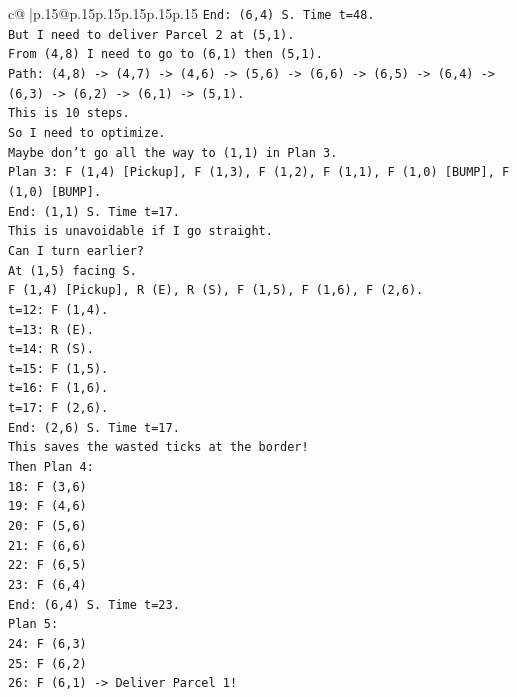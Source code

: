 \documentclass{article}
\begin{document}
{\begin{supertabular}{c@{$\;$}|p{.15\linewidth}@{}p{.15\linewidth}p{.15\linewidth}p{.15\linewidth}p{.15\linewidth}p{.15\linewidth}}
{{{\texttt{End: (6,4) S. Time t=48.} \\
\texttt{But I need to deliver Parcel 2 at (5,1).} \\
\texttt{From (4,8) I need to go to (6,1) then (5,1).} \\
\texttt{Path: (4,8) {-}> (4,7) {-}> (4,6) {-}> (5,6) {-}> (6,6) {-}> (6,5) {-}> (6,4) {-}> (6,3) {-}> (6,2) {-}> (6,1) {-}> (5,1).} \\
\texttt{This is 10 steps.} \\
\texttt{So I need to optimize.} \\
\texttt{Maybe don't go all the way to (1,1) in Plan 3.} \\
\texttt{Plan 3: F (1,4) {[}Pickup{]}, F (1,3), F (1,2), F (1,1), F (1,0) {[}BUMP{]}, F (1,0) {[}BUMP{]}.} \\
\texttt{End: (1,1) S. Time t=17.} \\
\texttt{This is unavoidable if I go straight.} \\
\texttt{Can I turn earlier?} \\
\texttt{At (1,5) facing S.} \\
\texttt{F (1,4) {[}Pickup{]}, R (E), R (S), F (1,5), F (1,6), F (2,6).} \\
\texttt{t=12: F (1,4).} \\
\texttt{t=13: R (E).} \\
\texttt{t=14: R (S).} \\
\texttt{t=15: F (1,5).} \\
\texttt{t=16: F (1,6).} \\
\texttt{t=17: F (2,6).} \\
\texttt{End: (2,6) S. Time t=17.} \\
\texttt{This saves the wasted ticks at the border!} \\
\texttt{Then Plan 4:} \\
\texttt{18: F (3,6)} \\
\texttt{19: F (4,6)} \\
\texttt{20: F (5,6)} \\
\texttt{21: F (6,6)} \\
\texttt{22: F (6,5)} \\
\texttt{23: F (6,4)} \\
\texttt{End: (6,4) S. Time t=23.} \\
\texttt{Plan 5:} \\
\texttt{24: F (6,3)} \\
\texttt{25: F (6,2)} \\
\texttt{26: F (6,1) {-}> Deliver Parcel 1!} \\
}}}
\end{supertabular}}
\end{document}

